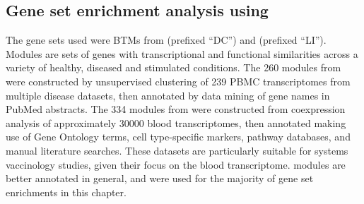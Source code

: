 \subsection{Gene set enrichment analysis using }
\label{subsec:hird_dge_geneSetEnrichment}


The gene sets used were \glspl{BTM} from \textcite{chaussabel2008ModularAnalysisFramework} (prefixed \enquote{DC}) and \textcite{li2013MolecularSignaturesAntibody} (prefixed \enquote{LI}).
Modules are sets of genes with transcriptional and functional similarities across a variety of healthy, diseased and stimulated conditions.
The 260 modules from \textcite{chaussabel2008ModularAnalysisFramework} were constructed by unsupervised clustering of 239 \gls{PBMC} transcriptomes from multiple disease datasets,
then annotated by data mining of gene names in PubMed abstracts.
The 334 modules from \textcite{li2013MolecularSignaturesAntibody} were constructed from coexpression analysis of approximately \num{30000} blood transcriptomes,
then annotated making use of Gene Ontology terms, cell type-specific markers, pathway databases, and manual literature searches.
These datasets are particularly suitable for systems vaccinology studies, given their focus on the blood transcriptome.
\textcite{li2013MolecularSignaturesAntibody} modules are better annotated in general, and were used for the majority of gene set enrichments in this chapter.

